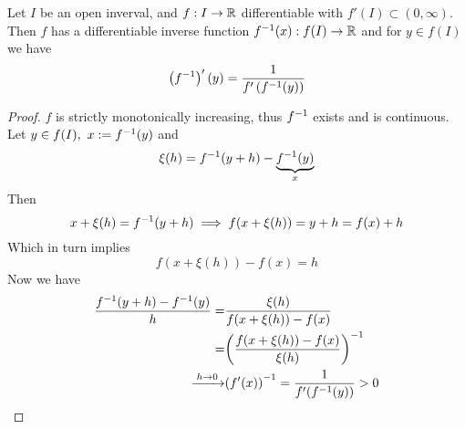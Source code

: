 \documentclass[../../script.tex]{subfiles}
\begin{document}
\begin{thm}
    Let $I$ be an open inverval, and $f: I \rightarrow \mathbb{R}$ differentiable with $f'(I) \subset (0, \infty)$.
    Then $f$ has a differentiable inverse function ${f}^{-1}(x): f(I) \rightarrow \mathbb{R}$ and for $y \in f(I)$ we have 
    \[
        \left({f}^{-1}\right)'(y) = \frac{1}{f'\left({f}^{-1}(y)\right)}
    \]
\end{thm}
\begin{proof}
    $f$ is strictly monotonically increasing, thus ${f}^{-1}$ exists and is continuous. Let $y \in f(I), ~x := {f}^{-1}(y)$ and 
    \begin{equation}
        \xi(h) = {f}^{-1}(y + h) - \underbrace{{f}^{-1}(y)}_x
    \end{equation}
    Then 
    \begin{equation}
        x + \xi(h) = {f}^{-1}(y + h) \implies f(x + \xi(h)) = y + h = f(x) + h
    \end{equation}
    Which in turn implies 
    \begin{equation}
        f(x + \xi(h)) - f(x) = h
    \end{equation}
    Now we have 
    \begin{equation}
    \begin{split}
        \frac{\inv{f}(y + h) - \inv{f}(y)}{h} =& \frac{\xi(h)}{f(x + \xi(h)) - f(x)} \\
        =& \inv{\left( \frac{f(x + \xi(h)) - f(x)}{\xi(h)} \right)} \\
        \conv{h \rightarrow 0}& \inv{\left(f'(x)\right)} = \frac{1}{f'(\inv{f}(y))}> 0
    \end{split}
    \end{equation}
\end{proof}
\end{document}
